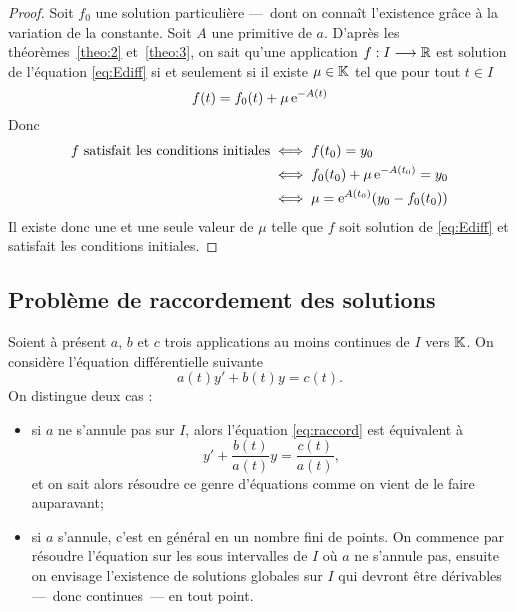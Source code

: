 \begin{proof}
  Soit \(f_0\) une solution particulière ---~dont on connaît l'existence grâce à
  la variation de la constante. Soit \(A\) une primitive de \(a\). D'après les
  théorèmes~\ref{theo:2} et~\ref{theo:3}, on sait qu'une application
  \(f:I \longrightarrow{} \mathbb{R}\) est solution de l'équation \eqref{eq:Ediff} si et
  seulement si il existe \(\mu \in \mathbb{K}\) tel que pour tout \(t \in I\)
  \begin{equation}
    f(t) = f_0(t) + \mu \operatorname{e}^{-A(t)}
  \end{equation}
  Donc
  \begin{align}
    f \text{~satisfait les conditions initiales} & \iff f(t_0) = y_0 \\
                                                 & \iff f_0(t_0) +
                                                 \mu\operatorname{e}^{-A(t_0)} = y_0 \\
                                                 & \iff \mu =
                                                 \operatorname{e}^{A(t_0)}(y_0-f_0(t_0))
  \end{align}
  Il existe donc une et une seule valeur de \(\mu\) telle que \(f\) soit solution
  de \eqref{eq:Ediff} et satisfait les conditions initiales.
\end{proof}

\subsection{Problème de raccordement des solutions}
\label{subsec:pbmraccordement}

Soient à présent \(a\), \(b\) et \(c\) trois applications au moins continues de
\(I\) vers \(\mathbb{K}\). On considère l'équation différentielle suivante
\begin{equation}
  \label{eq:raccord}
  a(t) y' + b(t)y = c(t).
\end{equation}
On distingue deux cas :
\begin{itemize}
  \item si \(a\) ne s'annule pas sur \(I\), alors l'équation
    \eqref{eq:raccord} est équivalent à
    \begin{equation}
      y' + \frac{b(t)}{a(t)} y = \frac{c(t)}{a(t)},
    \end{equation}
    et on sait alors résoudre ce genre d'équations comme on vient de le
    faire auparavant;
  \item si \(a\) s'annule, c'est en général en un nombre fini de points. On
    commence par résoudre l'équation sur les sous intervalles de \(I\) où
    \(a\) ne s'annule pas, ensuite on envisage l'existence de solutions
    globales sur \(I\) qui devront être dérivables ---~donc continues~--- en
    tout point.
\end{itemize}

